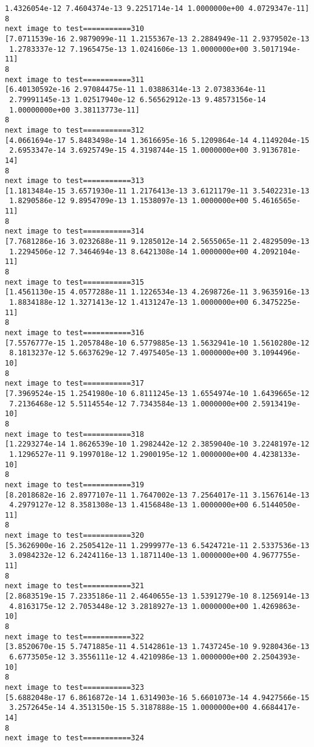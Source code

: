 \documentclass[11pt]{article}
\begin{document}
\begin{Verbatim}[commandchars=\\\{\}]
 1.4326054e-12 7.4604374e-13 9.2251714e-14 1.0000000e+00 4.0729347e-11]
8
next image to test===========310
[7.0711539e-16 2.9879099e-11 1.2155367e-13 2.2884949e-11 2.9379502e-13
 1.2783337e-12 7.1965475e-13 1.0241606e-13 1.0000000e+00 3.5017194e-11]
8
next image to test===========311
[6.40130592e-16 2.97084475e-11 1.03886314e-13 2.07383364e-11
 2.79991145e-13 1.02517940e-12 6.56562912e-13 9.48573156e-14
 1.00000000e+00 3.38113773e-11]
8
next image to test===========312
[4.0661694e-17 5.8483498e-14 1.3616695e-16 5.1209864e-14 4.1149204e-15
 2.6953347e-14 3.6925749e-15 4.3198744e-15 1.0000000e+00 3.9136781e-14]
8
next image to test===========313
[1.1813484e-15 3.6571930e-11 1.2176413e-13 3.6121179e-11 3.5402231e-13
 1.8290586e-12 9.8954709e-13 1.1538097e-13 1.0000000e+00 5.4616565e-11]
8
next image to test===========314
[7.7681286e-16 3.0232688e-11 9.1285012e-14 2.5655065e-11 2.4829509e-13
 1.2294506e-12 7.3464694e-13 8.6421308e-14 1.0000000e+00 4.2092104e-11]
8
next image to test===========315
[1.4561130e-15 4.0577288e-11 1.1226534e-13 4.2698726e-11 3.9635916e-13
 1.8834188e-12 1.3271413e-12 1.4131247e-13 1.0000000e+00 6.3475225e-11]
8
next image to test===========316
[7.5576777e-15 1.2057848e-10 6.5779885e-13 1.5632941e-10 1.5610280e-12
 8.1813237e-12 5.6637629e-12 7.4975405e-13 1.0000000e+00 3.1094496e-10]
8
next image to test===========317
[7.3969524e-15 1.2541980e-10 6.8111245e-13 1.6554974e-10 1.6439665e-12
 7.2136468e-12 5.5114554e-12 7.7343584e-13 1.0000000e+00 2.5913419e-10]
8
next image to test===========318
[1.2293274e-14 1.8626539e-10 1.2982442e-12 2.3859040e-10 3.2248197e-12
 1.1296527e-11 9.1997018e-12 1.2900195e-12 1.0000000e+00 4.4238133e-10]
8
next image to test===========319
[8.2018682e-16 2.8977107e-11 1.7647002e-13 7.2564017e-11 3.1567614e-13
 4.2979127e-12 8.3581308e-13 1.4156848e-13 1.0000000e+00 6.5144050e-11]
8
next image to test===========320
[5.3626900e-16 2.2505412e-11 1.2999977e-13 6.5424721e-11 2.5337536e-13
 3.0984232e-12 6.2424116e-13 1.1871140e-13 1.0000000e+00 4.9677755e-11]
8
next image to test===========321
[2.8683519e-15 7.2335186e-11 2.4640655e-13 1.5391279e-10 8.1256914e-13
 4.8163175e-12 2.7053448e-12 3.2818927e-13 1.0000000e+00 1.4269863e-10]
8
next image to test===========322
[3.8520670e-15 5.7471885e-11 4.5142861e-13 1.7437245e-10 9.9280436e-13
 6.6773505e-12 3.3556111e-12 4.4210986e-13 1.0000000e+00 2.2504393e-10]
8
next image to test===========323
[5.6882048e-17 6.8616872e-14 1.6314903e-16 5.6601073e-14 4.9427566e-15
 3.2572645e-14 4.3513150e-15 5.3187888e-15 1.0000000e+00 4.6684417e-14]
8
next image to test===========324

\end{Verbatim}
\end{document}
